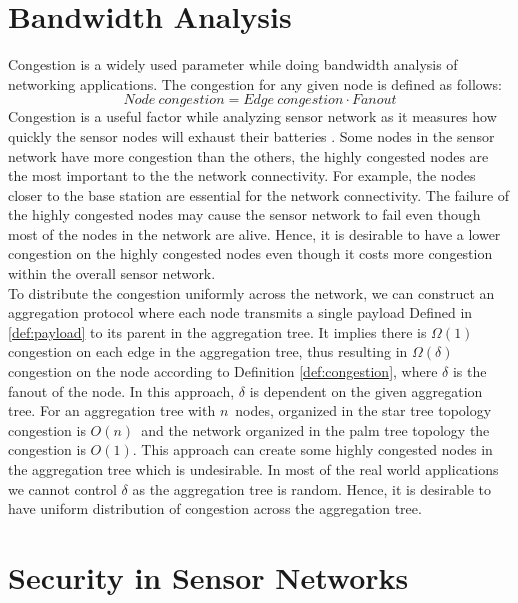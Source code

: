 \section{Bandwidth Analysis}
	Congestion is a widely used parameter while doing bandwidth analysis of networking applications. 
	The congestion for any given node is defined as follows:
	\begin{equation}\label{def:congestion}
		Node\ congestion = Edge\ congestion \cdot Fanout
	\end{equation}
	Congestion is a useful factor while analyzing sensor network as it measures how quickly the sensor nodes will exhaust their batteries \cite{madden2003design}. 
	Some nodes in the sensor network have more congestion than the others, the highly congested nodes are the most important to the the network connectivity.
	For example, the nodes closer to the base station are essential for the network connectivity.
	The failure of the highly congested nodes may cause the sensor network to fail even though most of the nodes in the network are alive.
	Hence, it is desirable to have a lower congestion on the highly congested nodes even though it costs more congestion within the overall sensor network.\\
	To distribute the congestion uniformly across the network, we can construct an aggregation protocol where each node transmits a single payload Defined in \ref{def:payload} to its parent in the aggregation tree.
	It implies there is $\Omega(1)$ congestion on each edge in the aggregation tree, thus resulting in $\Omega(\delta)$ congestion on the node  according to Definition \ref{def:congestion}, where $\delta$ is the fanout of the node.
	In this approach, $\delta$ is dependent on the given aggregation tree.
	For an aggregation tree with $n$\ nodes, organized in the star tree topology congestion is $O(n)$\ and the network organized in the palm tree topology the congestion is $O(1)$.
	This approach can create some highly congested nodes in the aggregation tree which is undesirable.
	In most of the real world applications we cannot control $\delta$ as the aggregation tree is random.
	Hence, it is desirable to have uniform distribution of congestion across the aggregation tree.



\section{Security in Sensor Networks}
	\label{sec:aggregate-adversary}

